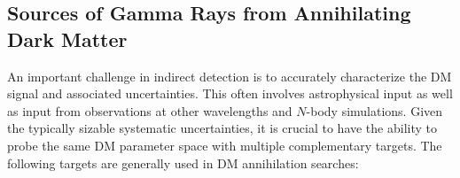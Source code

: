\subsection{Sources of Gamma Rays from Annihilating Dark Matter}

An important challenge in indirect detection is to accurately characterize the DM signal and associated uncertainties. This often involves astrophysical input as well as input from observations at other wavelengths and $N$-body simulations. Given the typically sizable systematic uncertainties, it is crucial to have the ability to probe the same DM parameter space with multiple complementary targets. The following targets are generally used in DM annihilation searches:  %
